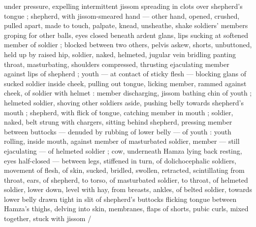 under pressure, expelling intermittent jissom spreading in clots over shepherd's tongue ; shepherd, with jissom-smeared hand --- other hand, opened, crushed, pulled apart, made to touch, palpate, knead, unsheathe, shake soldiers' members {\dashcom} groping for other balls, eyes closed beneath ardent glans, lips sucking at softened member of soldier ; blocked between two others, pelvis askew, shorts, unbuttoned, held up by raised hip, soldier, naked, helmeted, jugular vein bridling panting throat, masturbating, shoulders compressed, thrusting ejaculating member against lips of shepherd ; youth --- at contact of sticky flesh --- blocking glans of sucked soldier inside cheek, pulling out tongue, licking member, rammed against cheek, of soldier with helmet : member discharging, jissom bathing chin of youth ; helmeted soldier, shoving other soldiers aside, pushing belly towards shepherd's mouth ; shepherd, with flick of tongue, catching member in mouth ; soldier, naked, belt strung with chargers, sitting behind shepherd, pressing member between buttocks --- denuded by rubbing of lower belly --- of youth : youth rolling, inside mouth, against member of masturbated soldier, member --- still ejaculating --- of helmeted soldier ; cow, underneath Hamza lying back resting, eyes half-closed --- between legs, stiffened in turn, of dolichocephalic soldiers, movement of flesh, of skin, sucked, bridled, swollen, retracted, scintillating from throat, ears, of shepherd, to torso, of masturbated soldier, to throat, of helmeted soldier, lower down, level with hay, from breasts, ankles, of belted soldier, towards lower belly drawn tight in slit of shepherd's buttocks {\dashcom} flicking tongue between Hamza's thighs, delving into skin, membranes, flaps of shorts, pubic curls, mixed together, stuck with jissom {\slash} {\td} 
